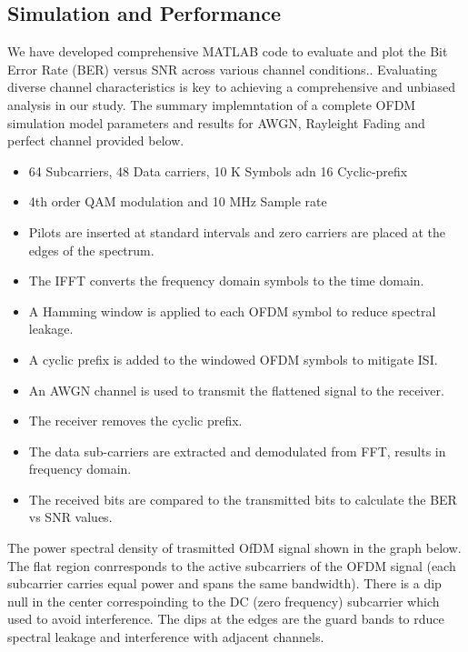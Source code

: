 \documentclass[conference]{IEEEtran}
\begin{document}
\subsection {Simulation and Performance}
      
      We have developed comprehensive MATLAB code to evaluate and plot the Bit Error Rate (BER) versus SNR across various channel conditions.. Evaluating diverse channel characteristics is key to achieving a comprehensive and unbiased analysis in our study. The summary implemntation of a complete OFDM simulation model parameters and results for AWGN, Rayleight Fading and perfect channel provided below. 
      
\begin{itemize}
\item 64 Subcarriers, 48 Data carriers, 10 K Symbols adn 16 Cyclic-prefix
\item 4th order QAM modulation and 10 MHz Sample rate
\item Pilots are inserted at standard intervals and zero carriers are placed at the edges of the spectrum.
\item The IFFT converts the frequency domain symbols to the time domain. 
\item A Hamming window is applied to each OFDM symbol to reduce spectral leakage. 
\item A cyclic prefix is added to the windowed OFDM symbols to mitigate ISI. 
\item An AWGN channel is used to transmit the flattened signal to the receiver.\par
\item The receiver removes the cyclic prefix. 
\item The data sub-carriers are extracted and demodulated from FFT, results in frequency domain. 
\item The received bits are compared to the transmitted bits to calculate the BER vs SNR values. 
\end{itemize}
The power spectral density of trasmitted OfDM signal shown in the graph below. The flat region conrresponds to the active subcarriers of the OFDM signal (each subcarrier carries equal power and spans the same bandwidth). There is a dip null in the center correspoinding to the DC (zero frequency) subcarrier which used to avoid interference. The dips at the edges are the guard bands to rduce spectral leakage and interference with adjacent channels.
\end{document}
